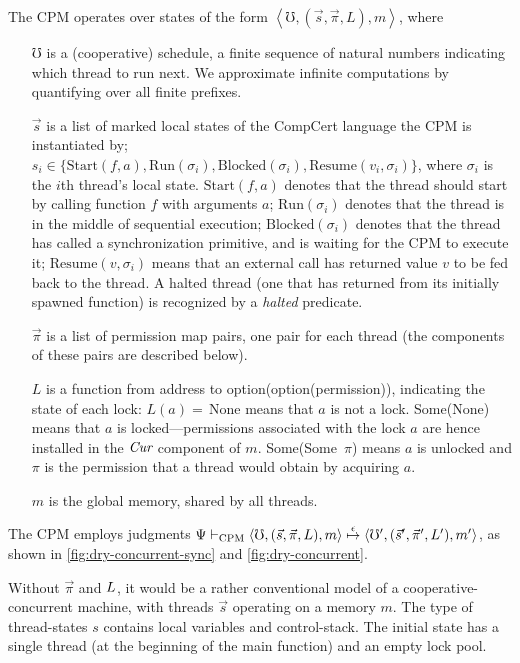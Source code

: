 The CPM operates over states of the form
$\left<\mho, (\vec{s}, \vec{\pi}, L), m \right>$, where
\begin{itemize}
\item[$\mho$] is a (cooperative) schedule,
a finite sequence of natural numbers indicating
which thread to run next.
We approximate infinite computations by
quantifying over all finite prefixes.
\item[$\vec{s}$] is a list of marked local states of the CompCert
  language the CPM is instantiated by; $s_i \in
  \{\mathrm{Start}(f,a),\mathrm{Run}(\sigma_i),
  \mathrm{Blocked}(\sigma_i),\mathrm{Resume}(v_i,\sigma_i)\}$, where
  $\sigma_i$ is the $i$th thread's local state.  
  $\mathrm{Start}(f,a)$
  denotes that the thread should start by calling function $f$ with
  arguments $a$; 
  $\mathrm{Run}(\sigma_i)$
  denotes that the thread is in the middle of sequential execution; 
  $\mathrm{Blocked}(\sigma_i)$
  denotes that the thread has called a synchronization primitive, and is waiting for the CPM to execute it; 
  $\mathrm{Resume}(v,\sigma_i)$ means that an external
  call has returned value $v$ to be fed back to the thread.  A halted thread (one that has returned from its initially spawned function) 
  is recognized by a \emph{halted} predicate.
  
  
\item[$\vec{\pi}$] is a list of permission map pairs, one pair
  for each thread (the components of these pairs are described below).
\item[$L$] is a function from address to option(option(permission)),
  indicating the state of each lock: $L(a)=\,$None means that $a$ is
  not a lock. Some(None) means that $a$ is locked---permissions
  associated with the lock $a$ are hence installed in the $\emph{Cur}$
  component of $m$.  Some(Some~$\pi$) means $a$ is unlocked and
  $\pi$ is the permission that a thread would obtain by acquiring
  $a$.
\item[$m$] is the global memory, shared by all threads.
\end{itemize}

The CPM employs judgments $ \Psi \vdash_\mathrm{CPM}
\left<\mho, (\vec{s}, \vec{\pi}, L), m \right>
\stackrel{\epsilon}\mapsto \left<\mho', (\vec{s}', \vec{\pi}',
  L'), m' \right> $, as shown in \cref{fig:dry-concurrent-sync} and \cref{fig:dry-concurrent}.

Without $\vec{\pi}$ and $L$, it would be a rather
conventional model of a cooperative-concurrent machine, with threads
$\vec{s}$ operating on a memory $m$.  The type of thread-states $s$
 contains local variables and control-stack.  
 The initial state has a single thread (at the beginning of
the \textsf{main} function) and an empty lock pool.

